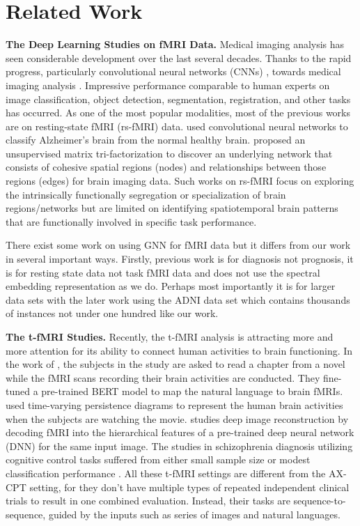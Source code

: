 \section{Related Work}
\label{sec:6}

\textbf{The Deep Learning Studies on fMRI Data.}\label{sec:6.1} Medical imaging analysis has seen considerable development over the last several decades. Thanks to the rapid progress, particularly convolutional neural networks (CNNs) \cite{DL2015}, towards medical imaging analysis \cite{WEN2020101694}. Impressive performance comparable to human experts on image classification, object detection, segmentation, registration, and other tasks \cite{LITJENS201760} has occurred. As one of the most popular modalities, most of the previous works are on resting-state fMRI (rs-fMRI) data. \cite{sarraf2016classification} used convolutional neural networks to classify Alzheimer's brain from the normal healthy brain. \cite{bai2017unsupervised} proposed an unsupervised matrix tri-factorization to discover an underlying network that consists of cohesive spatial regions (nodes) and relationships between those regions (edges) for brain imaging data. Such works on rs-fMRI focus on exploring the intrinsically functionally segregation or specialization of brain regions/networks \cite{logotjetis-fMRI} but are limited on identifying spatiotemporal brain patterns that are functionally involved in specific task performance. 

There exist some  work on using GNN for fMRI data \cite{10.1007/978-3-030-36683-4_65,Parisot2018DiseasePU} but it differs from our work in several important ways. Firstly, previous work is for diagnosis not prognosis, it is for resting state data  not task fMRI data and does not use the spectral embedding representation as we do. Perhaps most importantly it is for larger data sets with the later work \cite{Parisot2018DiseasePU} using the ADNI data set \cite{jack2008alzheimer} which contains thousands of instances not under one hundred like our work.

\textbf{The t-fMRI Studies.}\label{sec:6.2} Recently, the t-fMRI analysis is attracting more and more attention for its ability to connect human activities to brain functioning. In the work of \cite{schwartz2019inducing}, the subjects in the study are asked to read a chapter from a novel while the fMRI scans recording their brain activities are conducted. They fine-tuned a pre-trained BERT model to map the natural language to brain fMRIs. \cite{rieck2020uncovering} used time-varying persistence diagrams to represent the human brain activities when the subjects are watching the movie. \cite{10.1371/journal.pcbi.1006633} studies deep image reconstruction by decoding fMRI into the hierarchical features of a pre-trained deep neural network (DNN) for the same input image. The studies in schizophrenia diagnosis utilizing cognitive control tasks suffered from either small sample size or modest classification performance \cite{pmid29622496}. All these t-fMRI settings are different from the AX-CPT setting, for they don't have multiple types of repeated independent clinical trials to result in one combined evaluation. Instead, their tasks are sequence-to-sequence, guided by the inputs such as series of images and natural languages.

